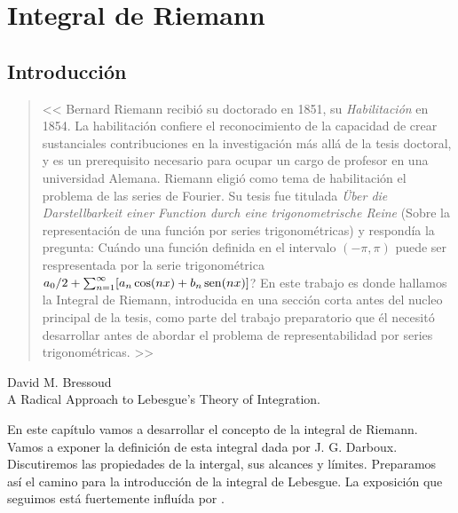 \chapter{Integral de Riemann}\label{chap:riemann}

\section{Introducción}

\begin{quotation}
<< Bernard Riemann recibió su doctorado en 1851, su \emph{Habilitación} en 1854. La habilitación confiere el reconocimiento de la capacidad de crear sustanciales contribuciones en la investigación más allá de la tesis doctoral, y es un prerequisito necesario para ocupar un cargo de profesor en una universidad Alemana. Riemann eligió como tema  de habilitación el problema de las series de Fourier. Su tesis fue titulada \emph{\"Uber die Darstellbarkeit einer Function durch eine trigonometrische Reine} (Sobre la representación de una función por series trigonométricas) y respondía la pregunta:  Cuándo una función definida en el intervalo $(-\pi,\pi)$ puede ser respresentada por la serie trigonométrica $a_0/2+\sum_{n=1}^{\infty}[a_n\cos(nx)+b_n\operatorname{sen}(nx)]$? 
En este trabajo  es donde hallamos   la Integral de Riemann, introducida en una sección corta antes del nucleo principal de la tesis, como parte del trabajo preparatorio que él necesitó desarrollar antes de abordar el problema de representabilidad por series trigonométricas. >> 
\end{quotation}
\begin{flushright}
 David M. Bressoud\\
 A Radical Approach to Lebesgue's Theory of Integration.
\end{flushright}


En este capítulo vamos a desarrollar el concepto de la integral de Riemann. Vamos a exponer la definición de esta integral dada por J. G. Darboux. Discutiremos las propiedades de la intergal, sus alcances y límites. Preparamos así el camino para la introducción de la integral de Lebesgue. La exposición que seguimos está fuertemente influída por \cite{bressoud2008radical}.

